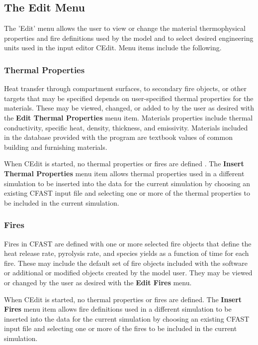 \subsection{The Edit Menu}


The 'Edit' menu allows the user to view or change the material thermophysical properties and fire definitions used by the model and to select desired engineering units used in the input editor CEdit. Menu items include the following.

\subsubsection{Thermal Properties}

Heat transfer through compartment surfaces, to secondary fire objects, or other targets that may be specified depends on user-specified thermal properties for the materials.  These may be viewed, changed, or added to by the user as desired with the \textbf{Edit Thermal Properties} menu item. Materials properties include thermal conductivity, specific heat, density, thickness, and emissivity. Materials included in the database provided with the program are textbook values of common building and furnishing materials.

When CEdit is started, no thermal properties or fires are defined \label{Thermal_Properties_Menu}.  The \textbf{Insert Thermal Properties} menu item allows thermal properties used in a different simulation to be inserted into the data for the current simulation by choosing an existing CFAST input file and selecting one or more of the thermal properties to be included in the current simulation.

\subsubsection{Fires}

Fires in CFAST are defined with one or more selected fire objects that define the heat release rate, pyrolysis rate, and species yields as a function of time for each fire.  These may include the default set of fire objects included with the software or additional or modified objects created by the model user. They may be viewed or changed by the user as desired with the \textbf{Edit Fires} menu.

When CEdit is started, no thermal properties or fires are defined.  The \textbf{Insert Fires} menu item allows fire definitions used in a different simulation to be inserted into the data for the current simulation by choosing an existing CFAST input file and selecting one or more of the fires to be included in the current simulation.





